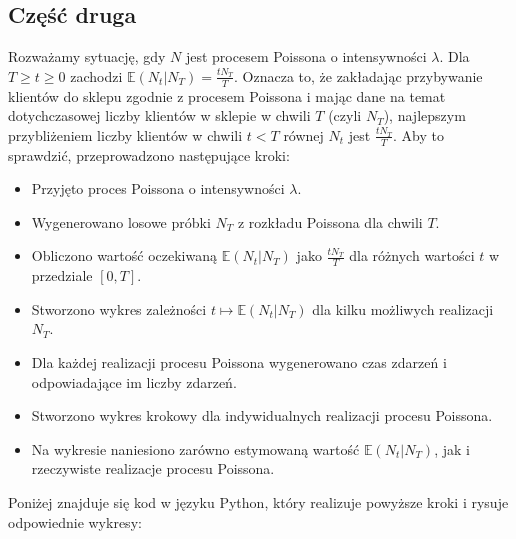 \documentclass[12pt,letterpaper]{article}
\theoremstyle{definition}
\begin{document}
\subsection{Część druga}

Rozważamy sytuację, gdy \( N \) jest procesem Poissona o intensywności \( \lambda \). Dla \( T \geq t \geq 0 \) zachodzi \( \mathbb{E}(N_t | N_T) = \frac{tN_T}{T} \). Oznacza to, że zakładając przybywanie klientów do sklepu zgodnie z procesem Poissona i mając dane na temat dotychczasowej liczby klientów w sklepie w chwili \( T \) (czyli \( N_T \)), najlepszym przybliżeniem liczby klientów w chwili \( t < T \) równej \( N_t \) jest \( \frac{tN_T}{T} \). Aby to sprawdzić, przeprowadzono następujące kroki:

\begin{itemize}
    \item Przyjęto proces Poissona o intensywności \( \lambda \).
    \item Wygenerowano losowe próbki \( N_T \) z rozkładu Poissona dla chwili \( T \).
    \item Obliczono wartość oczekiwaną \( \mathbb{E}(N_t | N_T) \) jako \( \frac{tN_T}{T} \) dla różnych wartości \( t \) w przedziale \([0, T]\).
    \item Stworzono wykres zależności \( t \mapsto \mathbb{E}(N_t | N_T) \) dla kilku możliwych realizacji \( N_T \).
    \item Dla każdej realizacji procesu Poissona wygenerowano czas zdarzeń i odpowiadające im liczby zdarzeń.
    \item Stworzono wykres krokowy dla indywidualnych realizacji procesu Poissona.
    \item Na wykresie naniesiono zarówno estymowaną wartość \( \mathbb{E}(N_t | N_T) \), jak i rzeczywiste realizacje procesu Poissona.
\end{itemize}
Poniżej znajduje się kod w języku Python, który realizuje powyższe kroki i rysuje odpowiednie wykresy:
\end{document}
